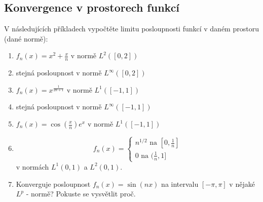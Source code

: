 \subsection{Konvergence v prostorech funkcí}
V následujících příkladech vypočtěte limitu posloupnosti funkcí v daném prostoru (dané normě):
\begin{enumerate}
        \item $f_n(x)= x^2+ \frac{x}{n}$ v normě $L^2([0,2])$
    \item stejná posloupnost v normě $L^\infty([0,2])$
    \item $f_n(x)= x^{\frac{1}{2n+1}}$ v normě $L^1([-1,1])$
    \item stejná posloupnost v normě $L^{\infty}([-1,1])$
    \item $f_n(x)= \cos(\frac{x}{n}) e^x$ v normě $L^1([-1,1])$
    \item \[f_n(x)=
                \left\{\begin{aligned}
                        n^{1/2} \text{ na $[0,\frac1n]$}\\
                        0 \text{ na $(\frac1n,1]$}
                       \end{aligned}\right.
               \]
               v normách $L^1{(0,1)}$ a $L^2{(0,1)}$.
    \item Konverguje posloupnost $f_n(x)=\sin(nx)$ na intervalu $[-\pi,\pi]$ v nějaké $L^p$ - normě?
         Pokuste se vysvětlit proč.
\end{enumerate}

